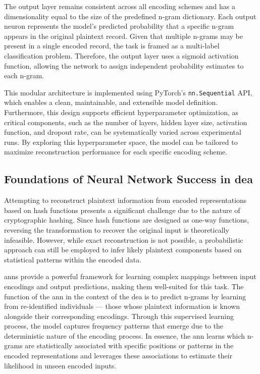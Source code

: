 The output layer remains consistent across all encoding schemes and has a dimensionality equal to the size of the predefined n-gram dictionary.
Each output neuron represents the model's predicted probability that a specific n-gram appears in the original plaintext record.
Given that multiple n-grams may be present in a single encoded record, the task is framed as a multi-label classification problem.
Therefore, the output layer uses a sigmoid activation function, allowing the network to assign independent probability estimates to each n-gram.

This modular architecture is implemented using PyTorch's \texttt{nn.Sequential} API, which enables a clean, maintainable, and extensible model definition.
Furthermore, this design supports efficient hyperparameter optimization, as critical components, such as the number of layers, hidden layer size, activation function, and dropout rate, can be systematically varied across experimental runs.
By exploring this hyperparameter space, the model can be tailored to maximize reconstruction performance for each specific encoding scheme.

\subsection{Foundations of Neural Network Success in \ac{dea}}

Attempting to reconstruct plaintext information from encoded representations based on hash functions presents a significant challenge due to the nature of cryptographic hashing.
Since hash functions are designed as one-way functions, reversing the transformation to recover the original input is theoretically infeasible.
However, while exact reconstruction is not possible, a probabilistic approach can still be employed to infer likely plaintext components based on statistical patterns within the encoded data.

\ac{ann}s provide a powerful framework for learning complex mappings between input encodings and output predictions, making them well-suited for this task.
The function of the \ac{ann} in the context of the \ac{dea} is to predict n-grams by learning from re-identified individuals — those whose plaintext information is known alongside their corresponding encodings.
Through this supervised learning process, the model captures frequency patterns that emerge due to the deterministic nature of the encoding process.
In essence, the \ac{ann} learns which n-grams are statistically associated with specific positions or patterns in the encoded representations and leverages these associations to estimate their likelihood in unseen encoded inputs.

